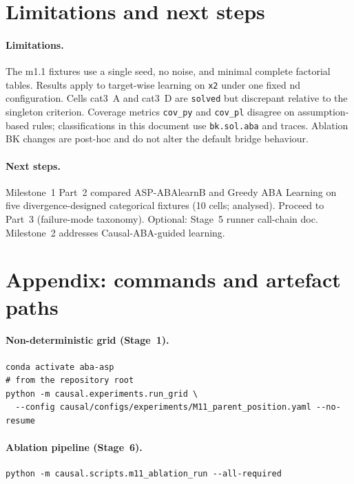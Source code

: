 \documentclass[11pt,a4paper]{article}
\begin{document}
\section{Limitations and next steps}

\paragraph{Limitations.} The m1.1 fixtures use a single seed, no noise, and minimal complete
factorial tables. Results apply to target-wise learning on \texttt{x2} under one fixed nd
configuration. Cells cat3~A and cat3~D are \texttt{solved} but discrepant relative to the
singleton criterion. Coverage metrics \texttt{cov\_py} and \texttt{cov\_pl} disagree on
assumption-based rules; classifications in this document use \texttt{bk.sol.aba} and traces.
Ablation BK changes are post-hoc and do not alter the default bridge behaviour.

\paragraph{Next steps.} Milestone~1 Part~2 compared ASP-ABAlearnB and Greedy ABA Learning
on five divergence-designed categorical fixtures (10 cells; analysed). Proceed to
Part~3 (failure-mode taxonomy). Optional: Stage~5 runner call-chain doc.
Milestone~2 addresses Causal-ABA-guided learning.

\section*{Appendix: commands and artefact paths}

\paragraph{Non-deterministic grid (Stage~1).}
\begin{verbatim}
conda activate aba-asp
# from the repository root
python -m causal.experiments.run_grid \
  --config causal/configs/experiments/M11_parent_position.yaml --no-resume
\end{verbatim}

\paragraph{Ablation pipeline (Stage~6).}
\begin{verbatim}
python -m causal.scripts.m11_ablation_run --all-required
\end{verbatim}
\end{document}
